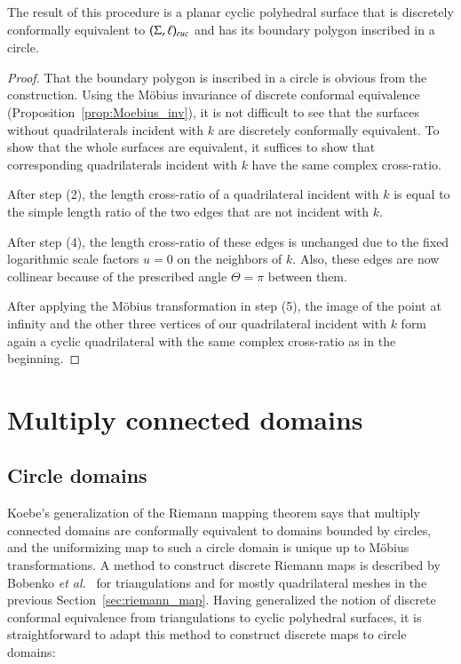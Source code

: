 \documentclass[Thesis]{subfiles}
\begin{document}
\begin{proposition}
  \label{prop:riemann_map}
  The result of this procedure is a planar cyclic polyhedral surface
  that is discretely conformally equivalent to $(\Sigma, \ell)_{\euc}$
  and has its boundary polygon inscribed in a circle.
\end{proposition}

\goodbreak
\begin{proof}
  That the boundary polygon is inscribed in a circle is obvious from
  the construction.  Using the M{\"o}bius invariance of discrete
  conformal equivalence (Proposition~\ref{prop:Moebius_inv}), it is
  not difficult to see that the surfaces without quadrilaterals
  incident with $k$ are discretely conformally equivalent. To show
  that the whole surfaces are equivalent, it suffices to show that
  corresponding quadrilaterals incident with $k$ have the same complex
  cross-ratio.

  After step (2), the length cross-ratio of a quadrilateral incident with
  $k$ is equal to the simple length ratio of the two edges that are
  not incident with $k$. 

  After step (4), the length cross-ratio of these edges is unchanged due
  to the fixed logarithmic scale factors $u=0$ on the neighbors of
  $k$. Also, these edges are now collinear because of the prescribed
  angle $\Theta=\pi$ between them.

  After applying the M{\"o}bius transformation in step (5), the image of
  the point at infinity and the other three vertices of our
  quadrilateral incident with $k$ form again a cyclic quadrilateral
  with the same complex cross-ratio as in the beginning.
\end{proof}

\section{Multiply connected domains}
\label{sec:multiply_connected}

\subsection{Circle domains}
\label{sec:circle_domains}

Koebe's generalization of the Riemann mapping theorem says that
multiply connected domains are conformally equivalent to domains
bounded by circles, and the uniformizing map to such a circle domain
is unique up to M{\"o}bius transformations. A method to construct
discrete Riemann maps is described by Bobenko {\it et al.}\ \cite[Section
3.3]{BPS2015:dconf} for triangulations and for mostly quadrilateral meshes in
the previous Section~\ref{sec:riemann_map}. Having generalized the
notion of discrete conformal equivalence from triangulations to cyclic
polyhedral surfaces, it is straightforward to adapt this method to
construct discrete maps to circle domains: 
\end{document}
